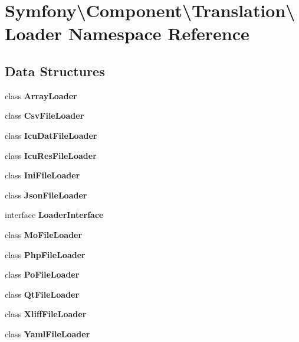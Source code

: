 \section{Symfony\textbackslash{}Component\textbackslash{}Translation\textbackslash{}Loader Namespace Reference}
\label{namespace_symfony_1_1_component_1_1_translation_1_1_loader}
\subsection*{Data Structures}
\begin{DoxyCompactItemize}
\item 
class {\bf Array\+Loader}
\item 
class {\bf Csv\+File\+Loader}
\item 
class {\bf Icu\+Dat\+File\+Loader}
\item 
class {\bf Icu\+Res\+File\+Loader}
\item 
class {\bf Ini\+File\+Loader}
\item 
class {\bf Json\+File\+Loader}
\item 
interface {\bf Loader\+Interface}
\item 
class {\bf Mo\+File\+Loader}
\item 
class {\bf Php\+File\+Loader}
\item 
class {\bf Po\+File\+Loader}
\item 
class {\bf Qt\+File\+Loader}
\item 
class {\bf Xliff\+File\+Loader}
\item 
class {\bf Yaml\+File\+Loader}
\end{DoxyCompactItemize}
